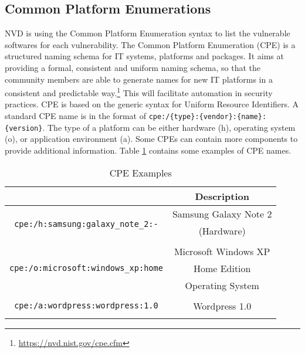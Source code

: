 \subsection{Common Platform Enumerations}
NVD is using the Common Platform Enumeration syntax to list the vulnerable softwares for each vulnerability. The Common Platform Enumeration (CPE) is a structured naming schema for IT systems, platforms and packages. It aims at providing a formal, consistent and uniform naming schema, so that the community members are able to generate names for new IT platforms in a consistent and predictable way.\footnote{\url{https://nvd.nist.gov/cpe.cfm}} This will facilitate automation in security practices. CPE is based on the generic syntax for Uniform Resource Identifiers. A standard CPE name is in the format of \texttt{cpe:/\{type\}:\{vendor\}:\{name\}:\{version\}}. The type of a platform can be either hardware (h), operating system (o), or application environment (a). Some CPEs can contain more components to provide additional information. Table \ref{table:sample_cpes} contains some examples of CPE names. 
\begin{table}
\begin{center}
    \begin{tabular}{ | c | c | }
    
    \hline
	 \hhline{|*2-}
     \multicolumn{1}{|c|}{\cellcolor{LightBlue}\textbf{CPE}} &  \multicolumn{1}{|c|}{\cellcolor{LightBlue}\textbf{Description}}  
    \\ \hline
    \multirow{3}{*}{\texttt{cpe:/h:samsung:galaxy\_note\_2:-}} & Samsung Galaxy Note 2 \\ & (Hardware) \\ & 
        \\ \hline
   \multirow{3}{*}{\texttt{cpe:/o:microsoft:windows\_xp:home}} & Microsoft Windows XP \\ & Home Edition \\ & Operating System
        \\ \hline
         \multirow{3}{*}{\texttt{cpe:/a:wordpress:wordpress:1.0}} &  \\ & Wordpress 1.0 \\ & 
        \\ \hline
    \end{tabular}
    \caption{CPE Examples}
    \label{table:sample_cpes}
   \end{center}
    
\end{table}

